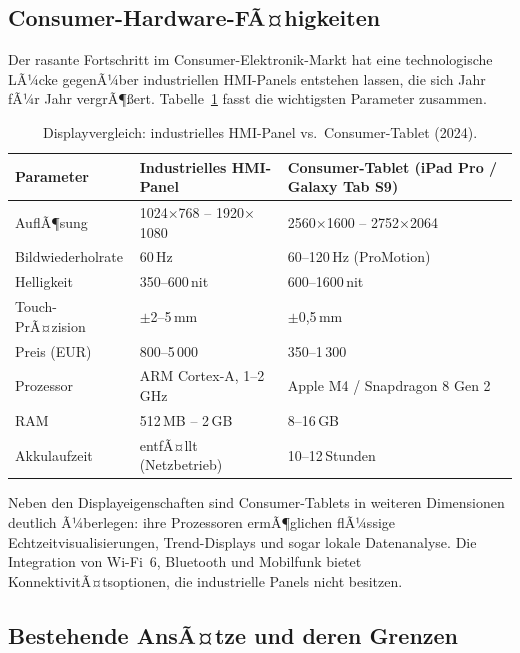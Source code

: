 ﻿\documentclass[12pt,a4paper]{article}
\begin{document}
\subsection{Consumer-Hardware-FÃ¤higkeiten}

Der rasante Fortschritt im Consumer-Elektronik-Markt hat eine technologische LÃ¼cke
gegenÃ¼ber industriellen HMI-Panels entstehen lassen, die sich Jahr fÃ¼r Jahr vergrÃ¶\ss{}ert.
Tabelle~\ref{tab:hw_comparison} fasst die wichtigsten Parameter zusammen.

\begin{table}[H]
\centering
\caption{Displayvergleich: industrielles HMI-Panel vs.\ Consumer-Tablet (2024).}
\label{tab:hw_comparison}
\begin{tabularx}{\textwidth}{lXX}
\toprule
\textbf{Parameter} & \textbf{Industrielles HMI-Panel} & \textbf{Consumer-Tablet (iPad Pro /
Galaxy Tab S9)} \\
\midrule
AuflÃ¶sung          & 1024$\times$768 -- 1920$\times$1080  & 2560$\times$1600 --
2752$\times$2064 \\
Bildwiederholrate  & 60\,Hz                               & 60--120\,Hz (ProMotion) \\
Helligkeit         & 350--600\,nit                        & 600--1600\,nit \\
Touch-PrÃ¤zision    & $\pm$2--5\,mm                        & $\pm$0{,}5\,mm \\
Preis (EUR)        & 800--5\,000                          & 350--1\,300 \\
Prozessor          & ARM Cortex-A, 1--2\,GHz              & Apple M4 / Snapdragon 8 Gen 2 \\
RAM                & 512\,MB -- 2\,GB                     & 8--16\,GB \\
Akkulaufzeit       & entfÃ¤llt (Netzbetrieb)               & 10--12\,Stunden \\
\bottomrule
\end{tabularx}
\end{table}

Neben den Displayeigenschaften sind Consumer-Tablets in weiteren Dimensionen deutlich
Ã¼berlegen: ihre Prozessoren ermÃ¶glichen flÃ¼ssige Echtzeitvisualisierungen, Trend-Displays
und sogar lokale Datenanalyse. Die Integration von Wi-Fi~6, Bluetooth und Mobilfunk bietet
KonnektivitÃ¤tsoptionen, die industrielle Panels nicht besitzen.

\subsection{Bestehende AnsÃ¤tze und deren Grenzen}
\end{document}
